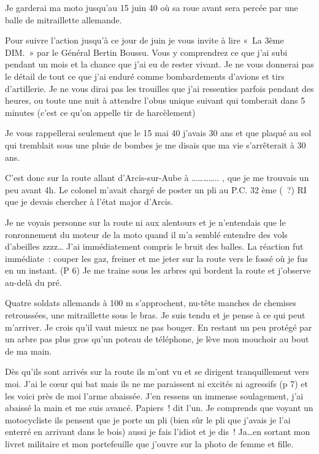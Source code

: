 \documentclass[a5paper,pagesize,10pt,bibtotoc,pointlessnumbers,
normalheadings,DIV=9,twoside=false]{scrbook}
\begin{document}
	Je garderai ma moto jusqu’au 15 juin 40 où sa roue avant sera percée par une balle de mitraillette allemande.
	
	Pour suivre l’action jusqu’à ce jour de juin je vous invite à lire « La 3ème DIM. » par le Général Bertin Boussu. Vous y comprendrez ce que j’ai subi pendant un mois et la chance que j’ai eu de rester vivant. Je ne vous donnerai pas le détail de tout ce que j’ai enduré comme bombardements d’avions et tirs d’artillerie. Je ne vous dirai pas les trouilles que j’ai ressenties parfois pendant des heures, ou toute une nuit à attendre l’obus unique suivant qui tomberait dans 5 minutes (c’est ce qu’on appelle tir de harcèlement)
	
	Je vous rappellerai seulement que le 15 mai 40 j’avais 30 ans et que plaqué au sol qui tremblait sous une pluie de bombes je me disais que ma vie s’arrêterait à 30 ans.
	
	C’est donc sur la route allant d’Arcis-sur-Aube à ………….. , que je me trouvais un peu avant 4h. Le colonel m’avait chargé de poster un pli au P.C.  32 ème ( ?) RI que je devais chercher à l’état major d’Arcis.
	
	Je ne voyais personne sur la route ni aux alentours et je n’entendais que le ronronnement du moteur de la moto quand il m’a semblé entendre des vols d’abeilles  zzzz… J’ai immédiatement compris le bruit des balles. La réaction fut immédiate : couper les gaz, freiner et me jeter sur la route vers le fossé où je fus en un instant.  (P 6) Je me traine sous les arbres qui bordent la route et j’observe au-delà du pré.
	
	Quatre soldats allemands à 100 m s’approchent, nu-tête manches de chemises retroussées, une mitraillette sous le bras. Je suis tendu et je pense à ce qui peut m’arriver. Je crois qu’il vaut mieux ne pas bouger. En restant un peu protégé par un arbre pas plus gros qu’un poteau de téléphone, je lève mon mouchoir au bout de ma main.
	
	Dès qu’ils sont arrivés sur la route ils m’ont vu et se dirigent tranquillement vers moi. J’ai le cœur qui bat mais ils ne me paraissent ni excités ni agressifs (p 7) et les voici près de moi l’arme abaissée. J’en ressens un immense soulagement, j’ai abaissé la main et me suis avancé. Papiers ! dit l’un. Je comprends que voyant un motocycliste ils pensent que je porte un pli (bien sûr le pli que j’avais je l’ai enterré en arrivant dans le bois) aussi je fais l’idiot et je dis ! Ja…en sortant mon livret militaire et mon portefeuille que j’ouvre sur la photo de femme et fille.
	
\end{document}
